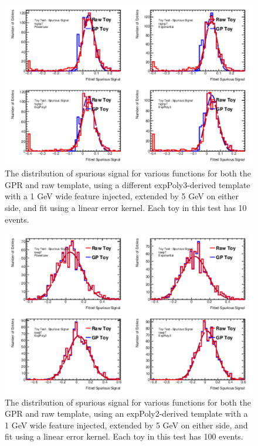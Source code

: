 \begin{figure} 
\begin{center}
  \includegraphics[width=\textwidth]{figures/background/gpr/validation/linear/ToyTest_FitSigVals_highpT_10_Sig_1s}   
\caption{The distribution of spurious signal for various functions for both the GPR and raw template, using a different expPoly3-derived template with a 1 GeV wide feature injected, extended by 5 GeV on either side, and fit using a linear error kernel. Each toy in this test has 10 events.}
\label{fig:linearkernel_highpt_10_Sig_1s}
\end{center}
\end{figure}

\begin{figure} 
\begin{center}
  \includegraphics[width=\textwidth]{figures/background/gpr/validation/linear/ToyTest_FitSigVals_lowpT_100_Sig_1s}   
\caption{The distribution of spurious signal for various functions for both the GPR and raw template, using an expPoly2-derived template with a 1 GeV wide feature injected, extended by 5 GeV on either side, and fit using a linear error kernel. Each toy in this test has 100 events.}
\label{fig:linearkernel_lowpt_100_Sig_1s}
\end{center}
\end{figure}

